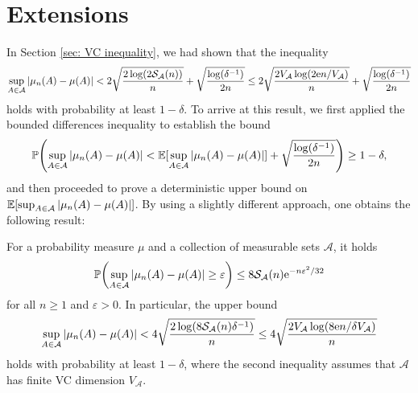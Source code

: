 \section{Extensions}

In Section \ref{sec: VC inequality}, we had shown that the inequality
\[
    \sup_{A \in \mathcal{A}} \abs{\mu_n(A) - \mu(A)} < 2 \sqrt{\frac{2 \log(2 \mathcal{S}_{\mathcal{A}}(n))}{n}} + \sqrt{\frac{\log(\delta^{-1})}{2n}} \leq 2 \sqrt{\frac{2 V_{\mathcal{A}} \log(2 \mathrm{e} n / V_{\mathcal{A}})}{n}} + \sqrt{\frac{\log(\delta^{-1})}{2n}}
\]
holds with probability at least $1 - \delta$. To arrive at this result, we first applied the bounded differences inequality to establish the bound
\[
    \Prob\left(\sup_{A \in \mathcal{A}} \abs{\mu_n(A) - \mu(A)} < \Exp[\sup_{A \in \mathcal{A}} \abs{\mu_n(A) - \mu(A)}] + \sqrt{\frac{\log(\delta^{-1})}{2n}}\right) \geq 1 - \delta,
\]
and then proceeded to prove a deterministic upper bound on $\operatorname{\mathbb{E}}[\sup_{A \in \mathcal{A}} \abs{\mu_n(A) - \mu(A)}]$. By using a slightly different approach, one obtains the following result:

\begin{theorem}
\label{thm: fast rate VC inequality}
For a probability measure $\mu$ and a collection of measurable sets $\mathcal{A}$, it holds
\[
    \Prob\left(\sup_{A \in \mathcal{A}} \abs{\mu_n(A) - \mu(A)} \geq \varepsilon\right) \leq 8 \mathcal{S}_{\mathcal{A}}(n) \e^{-n \varepsilon^2 / 32}
\]
for all $n \geq 1$ and $\varepsilon > 0$. In particular, the upper bound
\[
    \sup_{A \in \mathcal{A}} \abs{\mu_n(A) - \mu(A)} < 4 \sqrt{\frac{2 \log(8 \mathcal{S}_{\mathcal{A}}(n) \delta^{-1})}{n}} \leq 4 \sqrt{\frac{2 V_{\mathcal{A}} \log(8 \mathrm{e} n / \delta V_{\mathcal{A}})}{n}}
\]
holds with probability at least $1 - \delta$, where the second inequality assumes that $\mathcal{A}$ has finite VC dimension $V_{\mathcal{A}}$.
\end{theorem}

